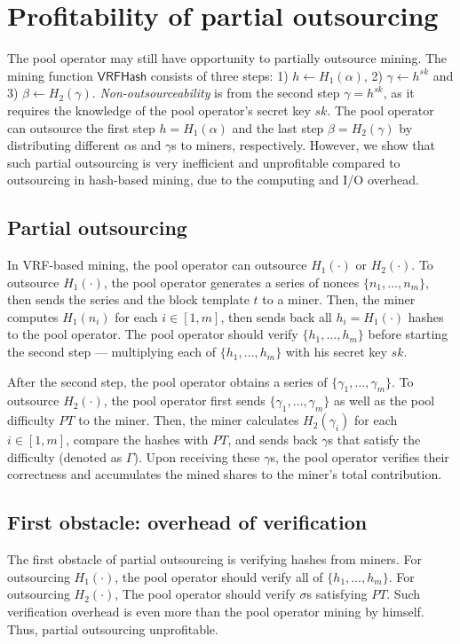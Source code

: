 \section{Profitability of partial outsourcing}
\label{sec:partial-outsourcing}

The pool operator may still have opportunity to partially outsource mining.
The mining function $\mathsf{VRFHash}$ consists of three steps: 1) $h \gets H_1(\alpha)$, 2) $\gamma \gets h^{sk}$ and 3) $\beta \gets H_2(\gamma)$.
\emph{Non-outsourceability} is from the second step $\gamma = h^{sk}$, as it requires the knowledge of the pool operator's secret key $sk$.
The pool operator can outsource the first step $h = H_1(\alpha)$ and the last step $\beta = H_2(\gamma)$ by distributing different $\alpha$s and $\gamma$s to miners, respectively.
However, we show that such partial outsourcing is very inefficient and unprofitable compared to outsourcing in hash-based mining, due to the computing and I/O overhead.



\subsection{Partial outsourcing}

In VRF-based mining, the pool operator can outsource $H_1(\cdot)$ or $H_2(\cdot)$.
To outsource $H_1(\cdot)$, the pool operator generates a series of nonces $\{n_1, \dots, n_m\}$, then sends the series and the block template $t$ to a miner.
Then, the miner computes $H_1(n_i)$ for each $i \in [1, m]$, then sends back all $h_i = H_1(\cdot)$ hashes to the pool operator.
The pool operator should verify $\{h_1, \dots, h_m\}$ before starting the second step --- multiplying each of $\{h_1, \dots, h_m\}$ with his secret key $sk$.

After the second step, the pool operator obtains a series of $\{\gamma_1, \dots, \gamma_m\}$.
To outsource $H_2(\cdot)$, the pool operator first sends $\{\gamma_1, \dots, \gamma_m\}$ as well as the pool difficulty $PT$ to the miner.
Then, the miner calculates $H_2(\gamma_i)$ for each $i \in [1, m]$, compare the hashes with $PT$, and sends back $\gamma$s that satisfy the difficulty (denoted as $\Gamma$).
Upon receiving these $\gamma$s, the pool operator verifies their correctness and accumulates the mined shares to the miner's total contribution.


\subsection{First obstacle: overhead of verification}
The first obstacle of partial outsourcing is verifying hashes from miners.
For outsourcing $H_1(\cdot)$, the pool operator should verify all of $\{h_1, \dots, h_m\}$.
For outsourcing $H_2(\cdot)$, The pool operator should verify $\sigma$s satisfying $PT$.
Such verification overhead is even more than the pool operator mining by himself.
Thus, partial outsourcing unprofitable.


